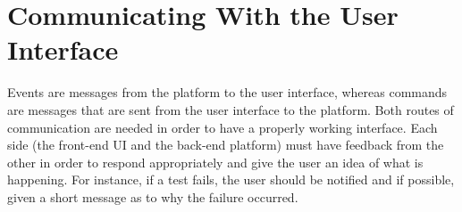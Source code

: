 \documentclass{report}
\begin{document}
	\begin{minipage}{\linewidth}
		\label{fig:test}
	\end{minipage}
	\vspace{5pt}		%

\section{Communicating With the User Interface}
Events are messages from the platform to the user interface, whereas commands are messages that are sent from the user interface to the platform. Both routes of communication are needed in order to have a properly working interface. Each side (the front-end UI and the back-end platform) must have feedback from the other in order to respond appropriately and give the user an idea of what is happening. For instance, if a test fails, the user should be notified and if possible, given a short message as to why the failure occurred.\\
\end{document}

